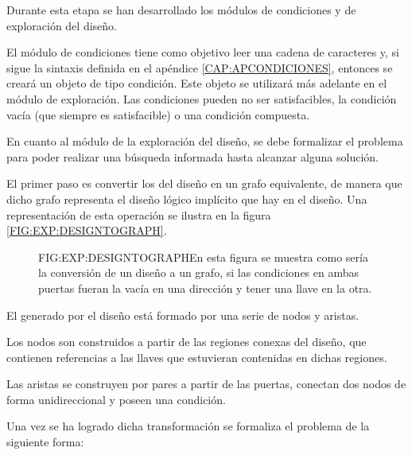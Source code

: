 Durante esta etapa se han desarrollado los módulos de condiciones y de exploración del diseño.

El módulo de condiciones tiene como objetivo leer una cadena de caracteres y, si sigue la sintaxis definida en el apéndice \ref{CAP:APCONDICIONES}, entonces se creará un objeto de tipo condición. Este objeto se utilizará más adelante en el módulo de exploración. Las condiciones pueden no ser satisfacibles, la condición vacía (que siempre es satisfacible) o una condición compuesta.

En cuanto al módulo de la exploración del diseño, se debe formalizar el problema para poder realizar una búsqueda informada hasta alcanzar alguna solución.

El primer paso es convertir los  del diseño en un grafo equivalente, de manera que dicho grafo representa el diseño lógico implícito que hay en el diseño. Una representación de esta operación se ilustra en la figura \ref{FIG:EXP:DESIGNTOGRAPH}.

\begin{figure}{FIG:EXP:DESIGNTOGRAPH}{En esta figura se muestra como sería la conversión de un diseño a un grafo, si las condiciones en ambas puertas fueran la vacía en una dirección y tener una llave en la otra.}
	 \quad
\end{figure}

El  generado por el diseño está formado por una serie de nodos y aristas.\newline

Los nodos son construidos a partir de las regiones conexas del diseño, que contienen referencias a las llaves que estuvieran contenidas en dichas regiones.\newline

Las aristas se construyen por pares a partir de las puertas, conectan dos nodos de forma unidireccional y poseen una condición.


Una vez se ha logrado dicha transformación se formaliza el problema de la siguiente forma:

